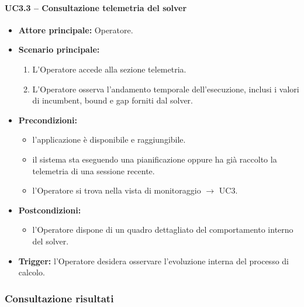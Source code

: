 \paragraph{UC3.3 -- Consultazione telemetria del solver}
\begin{itemize}
    \item \textbf{Attore principale:} Operatore.
    \item \textbf{Scenario principale:}
    \begin{enumerate}
        \item L'Operatore accede alla sezione telemetria.
        \item L'Operatore osserva l'andamento temporale dell'esecuzione, inclusi i valori di \gls{incumbent}, bound e gap forniti dal solver.
    \end{enumerate}
    \item \textbf{Precondizioni:}
    \begin{itemize}
        \item l'applicazione è disponibile e raggiungibile.
        \item il sistema sta eseguendo una pianificazione oppure ha già raccolto la telemetria di una sessione recente.
        \item l'Operatore si trova nella vista di monitoraggio $\rightarrow$ UC3.
    \end{itemize}
    \item \textbf{Postcondizioni:}
    \begin{itemize}
        \item l'Operatore dispone di un quadro dettagliato del comportamento interno del solver.
    \end{itemize}
    \item \textbf{Trigger:} l'Operatore desidera osservare l'evoluzione interna del processo di calcolo.
\end{itemize}

\subsubsection{Consultazione risultati}

